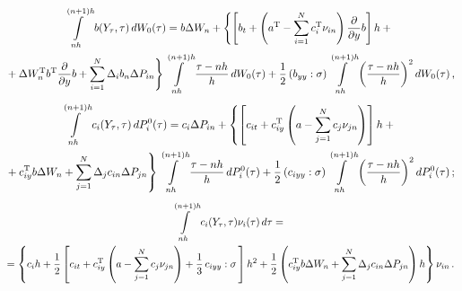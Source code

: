 {    %
    
    \noindent
\begin{multline*}
\int\limits_{nh}^{(n+1)h}b(Y_{\tau},\tau)\,dW_0(\tau)=b\Delta W_n+
    \left\{ \left[b_{t}+\left( a^{\mathrm{T}}-\sumin c_i^{\mathrm{T}}\nu_{in}\right)\fr{\partial}
{\partial y} b\right]h+{}\right.\\
\left.{}+\Delta W_n^{\mathrm{T}} b^{\mathrm{T}} \fr{\partial}{\partial y} b +
    \sumin \Delta_i b_{n} \Delta P_{in}\right \} \int\limits_{nh}^{(n+1)h}
    \ovth \,dW_0(\tau)+\fr{1}{2}\left(b_{yy}:\sigma\right) \int\limits_{nh}^{(n+1)h}
    \left(\ovth\right)^2 dW_0(\tau)\,, %
    \end{multline*}
        \begin{multline*}
    \int\limits_{nh}^{(n+1)h}c_i(Y_{\tau},\tau)\,dP_i^0(\tau)=
    c_i\Delta P_{in}+\left\{ \left[c_{it}+c_{iy}^{\mathrm{T}}
    \left( a-\sum\limits_{j=1}^N c_j\nu_{jn}\right)\right]h+{}\right.\\
\left.    {}+
    c_{iy}^{\mathrm{T}} b\Delta W_n + \sum\limits_{j=1}^N \Delta_j c_{in}
    \Delta P_{jn}\right \} \int\limits_{nh}^{(n+1)h}\ovth\, dP_i^0(\tau)+\fr{1}{2}\left(c_{iyy}:\sigma\right) \int\limits_{nh}^{(n+1)h}
    \left(\ovth\right)^2 dP_i^0(\tau)\,;  %
    \end{multline*}
\begin{multline*}
\int\limits_{nh}^{(n+1)h}c_i(Y_{\tau},\tau)\nu_i(\tau)\,d\tau ={}\\
{}=
    \left\{c_ih+\fr{1}{2}\left[c_{it}+c_{iy}^{\mathrm{T}}
    \left( a-\sum\limits_{j=1}^N c_j\nu_{jn}\right)+\fr{1}{3}\,c_{iyy}:\sigma\,\right]h^2+
\fr{1}{2}\left (c_{iy}^{\mathrm{T}} b\Delta W_n + \sum\limits_{j=1}^N
    \Delta_j c_{in} \Delta P_{jn}\right )h\right\}\nu_{in}\,. %
    \end{multline*}

}
